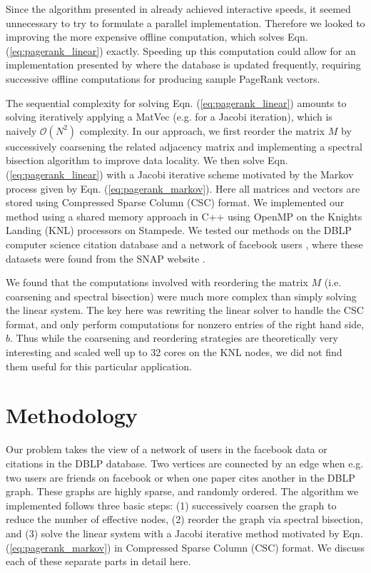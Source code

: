 \documentclass[11pt]{article}
\begin{document}
Since the algorithm presented in \cite{xie} already achieved interactive speeds, it seemed
unnecessary to try to formulate a parallel implementation. Therefore we looked
to improving the more expensive offline computation, which solves Eqn.
(\ref{eq:pagerank_linear}) exactly. Speeding up this computation could allow for
an implementation presented by \cite{xie} where the database is updated
frequently, requiring successive offline computations for producing sample
PageRank vectors.

The sequential complexity for solving Eqn. (\ref{eq:pagerank_linear}) amounts to
solving iteratively applying a MatVec (e.g. for a Jacobi iteration), which is
naively $\mathcal{O}(N^2)$ complexity. In our approach, we first reorder the
matrix $M$ by successively coarsening the related adjacency matrix and
implementing a spectral bisection algorithm to improve data locality. We then
solve Eqn. (\ref{eq:pagerank_linear}) with a Jacobi iterative scheme motivated
by the Markov process given by Eqn. (\ref{eq:pagerank_markov}). Here all
matrices and vectors are stored using Compressed Sparse Column (CSC) format. We
implemented our method using a shared memory approach in C++ using OpenMP on the Knights Landing (KNL) processors on
Stampede. We tested our methods on the DBLP computer science citation database
\cite{dblp} and a network of facebook users \cite{facebook}, where these
datasets were found from the SNAP website \cite{snapnets}. 

We found that the computations involved with reordering the matrix $M$ (i.e.
coarsening and spectral bisection) were much more complex than simply solving
the linear system. The key here was rewriting the linear solver to handle the
CSC format, and only perform computations for nonzero entries of the right hand
side, $b$. Thus while the coarsening and reordering strategies are theoretically
very interesting and scaled well up to 32 cores on the KNL nodes, 
we did not find them useful for this particular application. 



\section{Methodology}

Our problem takes the view of a network of users in the facebook data or
citations in the DBLP database. Two vertices are connected by an edge when e.g. two
users are friends on facebook or when one paper cites another in the DBLP graph.
These graphs are highly sparse, and randomly ordered.
The algorithm we implemented follows three basic steps: (1) successively coarsen
the graph to reduce the number of effective nodes, (2) reorder the graph via
spectral bisection, and (3) solve the linear system with a Jacobi iterative
method motivated by Eqn. (\ref{eq:pagerank_markov}) in Compressed Sparse
Column (CSC) format. We discuss each of these separate parts in detail here. 
\end{document}
